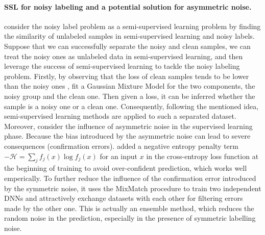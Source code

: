 \paragraph{SSL for noisy labeling and a potential solution for asymmetric noise.}
\citet{li2020dividemix} consider the noisy label problem as a semi-supervised learning problem by finding the similarity of unlabeled samples in semi-supervised learning and noisy labels. Suppose that we can successfully separate the noisy and clean samples, we can treat the noisy ones as unlabeled data in semi-supervised learning, and then leverage the success of semi-supervised learning to tackle the noisy labeling problem. Firstly, by observing that the loss of clean samples tends to be lower than the noisy ones \citep{arazo2019unsupervised}, \citet{li2020dividemix} fit a Gaussian Mixture Model for the two components, the noisy group and the clean one. Then given a loss, it can be inferred whether the sample is a noisy one or a clean one. Consequently, following the mentioned idea, semi-supervised learning methods are applied to such a separated dataset. Moreover, \citet{li2020dividemix} consider the influence of asymmetric noise in the supervised learning phase. Because the bias introduced by the asymmetric noise can lead to severe consequences (confirmation errors). \citep{li2020dividemix} added a negative entropy penalty term $-\mathcal{H} = \sum_j f_j(x) \log f_j(x) $ for an input $x$ in the cross-entropy loss function at the beginning of training to avoid over-confident prediction, which works well emperically. To further reduce the influence of the confirmation error introduced by the symmetric noise, it uses the MixMatch \citep{berthelot2019mixmatch} procedure to train two independent DNNs and attractively exchange datasets with each other for filtering errors made by the other one. This is actually an ensemble method, which reduces the random noise in the prediction, especially in the presence of symmetric labelling noise. 

